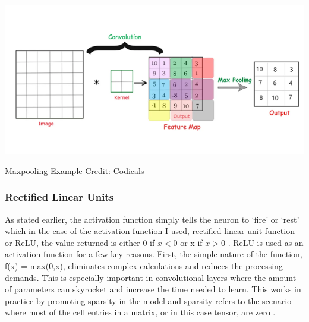 \documentclass[12pt]{article}
\begin{document}
                \begin{table}[ht]
            
                    \begin{center}
    
                        \includegraphics[scale=0.9]{maxpooling.png}
                        \caption{Maxpooling Example \cite{kumar2021} Credit: Codicals}
                        \label{maxpool-fig}
            
                    \end{center}
                    
                \end{table}

            \subsubsection{Rectified Linear Units}

                As stated earlier, the activation function simply tells the neuron to ‘fire’ or ‘rest’ 
                which in the case of the activation function I used, rectified linear unit function or ReLU, 
                the value returned is either 0 if $ x < 0 $ or x if $ x > 0 $ \cite{agarap2019}. 
                ReLU is used as an activation function for a few key reasons. First, the simple nature of the function, 
                f(x) = max(0,x), eliminates complex calculations and reduces the processing demands. 
                This is especially important in convolutional layers where the amount of parameters can skyrocket 
                and increase the time needed to learn. This works in practice by promoting sparsity in the model 
                and sparsity refers to the scenario where most of the cell entries in a matrix, 
                or in this case tensor, are zero \cite{giskard}.
                
\end{document}
